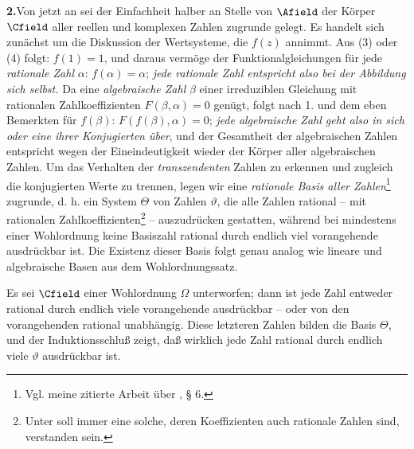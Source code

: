 \documentclass[11pt]{article}
\begin{document}
\medskip
\noindent\textbf{2.}\quad Von jetzt an sei der Einfachheit halber an Stelle von \(\Afield\) der Körper \(\Cfield\) aller reellen und komplexen Zahlen zugrunde gelegt. Es handelt sich zunächst um die Diskussion der Wertsysteme, die \(f(z)\) annimmt. Aus (3) oder (4) folgt: \(f(1)=1\), und daraus vermöge der Funktionalgleichungen für jede \emph{rationale Zahl} \(\alpha\): \(f(\alpha)=\alpha\); \emph{jede rationale Zahl entspricht also bei der Abbildung sich selbst.} Da eine \emph{algebraische Zahl} \(\beta\) einer irreduziblen Gleichung mit rationalen Zahlkoeffizienten \(F(\beta,\alpha)=0\) genügt, folgt nach 1. und dem eben Bemerkten für \(f(\beta)\): \(F(f(\beta),\alpha)=0\); \emph{jede algebraische Zahl geht also in sich oder eine ihrer Konjugierten über}, und der Gesamtheit der algebraischen Zahlen entspricht wegen der Eineindeutigkeit wieder der Körper aller algebraischen Zahlen. Um das Verhalten der \emph{transzendenten} Zahlen zu erkennen und zugleich die konjugierten Werte zu trennen, legen wir eine \emph{rationale Basis aller Zahlen}\footnote{Vgl. meine zitierte Arbeit über , § 6.} zugrunde, d. h. ein System \(\Theta\) von Zahlen \(\vartheta\), die alle Zahlen rational -- mit rationalen Zahlkoeffizienten\footnote{Unter  soll immer eine solche, deren Koeffizienten auch rationale Zahlen sind, verstanden sein.} -- auszudrücken gestatten, während bei mindestens einer Wohlordnung keine Basiszahl rational durch endlich viel vorangehende ausdrückbar ist. Die Existenz dieser Basis folgt genau analog wie lineare und algebraische Basen aus dem Wohlordnungssatz.

Es sei \(\Cfield\) einer Wohlordnung \(\Omega\) unterworfen; dann ist jede Zahl entweder rational durch endlich viele vorangehende ausdrückbar -- oder von den vorangehenden rational unabhängig. Diese letzteren Zahlen bilden die Basis \(\Theta\), und der Induktionsschluß zeigt, daß wirklich jede Zahl rational durch endlich viele \(\vartheta\) ausdrückbar ist.
\end{document}
